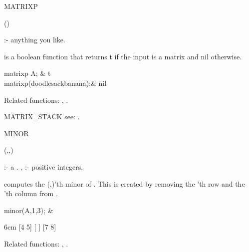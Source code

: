 \begin{Operator}[matrixp]{MATRIXP}

\begin{Syntax}
()
\end{Syntax}

 :- anything you like.

 is a boolean function that returns t if the input is a 
matrix and nil otherwise.


\begin{Examples}

matrixp A; &
t \\
matrixp(doodlesackbanana);&
nil 

\end{Examples}

Related functions: , .

\end{Operator}


\begin{Operator}[matrixstack]{MATRIX_STACK}
see:  .
\end{Operator}


\begin{Operator}[minor]{MINOR}

\begin{Syntax}
(,,)
\end{Syntax}

            :- a .
,        :- positive integers.

 computes the (,)'th minor of .
This is created by removing the 'th row and the 'th 
column from .

                
\begin{Examples}

minor(A,1,3); &
\begin{multilineoutput}{6cm}
[4  5]
[    ]
[7  8]
\end{multilineoutput}

\end{Examples}

Related functions:
, .

\end{Operator}


